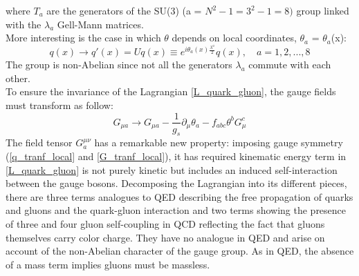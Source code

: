 where $T_{a}$ are the generators of the SU(3) (a = $N^{2} - 1 = 3^{2} - 1 = 8)$ group linked with the $\lambda_{a}$ Gell-Mann matrices. \\
More interesting is the case in which $\theta$ depends on local coordinates, $\theta_{a}$ = $\theta_{a}$(x):
\begin{equation}
q(x) \to q'(x) = Uq(x) \equiv e^{i\theta_{a}(x)\frac{\lambda^{a}}{2}}q(x), \quad a = 1, 2, ...,8
\label{q_tranf_local}
\end{equation}
The group is non-Abelian since not all the generators $\lambda_{a}$ commute with each other. \\
To ensure the invariance of the Lagrangian \ref{L_quark_gluon}, the gauge fields must transform as follow:
\begin{equation}
G_{\mu a} \to G_{\mu a} - \frac{1}{g_{s}} \partial_{\mu}\theta_{a} - f_{abc}\theta^{b}G^{c}_{\mu}
\label{G_tranf_local}
\end{equation}
The field tensor $G^{\mu\nu}_{a}$ has a remarkable new property: imposing gauge symmetry (\ref{q_tranf_local} and \ref{G_tranf_local}), it has required kinematic energy term in \ref{L_quark_gluon} is not purely kinetic but includes an induced self-interaction between the gauge bosons. Decomposing the Lagrangian into its different pieces, there are three terms analogues to QED describing the free propagation of quarks and gluons and the quark-gluon interaction and two terms showing the presence of three and four gluon self-coupling in QCD reflecting the fact that gluons themselves carry color charge. They have no analogue in QED and arise on account of the non-Abelian character of the gauge group. As in QED, the absence of a mass term implies gluons must be massless.\\

